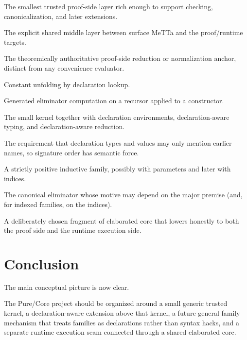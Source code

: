 \documentclass[11pt]{article}
\newcommand{\MeTTa}{\textup{MeTTa}}
\newcommand{\cdev}{\ensuremath{\mathsf{cdev}}}
\newcommand{\deltared}{\ensuremath{\delta}}
\newcommand{\iotared}{\ensuremath{\iota}}
\begin{document}
\begin{description}[leftmargin=2em,style=nextline]
  \item[Semantic waist] The smallest trusted proof-side layer rich enough to
  support checking, canonicalization, and later extensions.

  \item[Elaborated core] The explicit shared middle layer between surface
  \MeTTa{} and the proof/runtime targets.

  \item[Canonicalization / $\cdev$] The theoremically authoritative proof-side
  reduction or normalization anchor, distinct from any convenience evaluator.

  \item[$\deltared$-unfolding] Constant unfolding by declaration lookup.

  \item[$\iotared$-reduction] Generated eliminator computation on a recursor
  applied to a constructor.

  \item[Declaration-aware kernel] The small kernel together with declaration
  environments, declaration-aware typing, and declaration-aware reduction.

  \item[Prefix discipline] The requirement that declaration types and values may
  only mention earlier names, so signature order has semantic force.

  \item[Ordinary family] A strictly positive inductive family, possibly with
  parameters and later with indices.

  \item[Dependent recursor] The canonical eliminator whose motive may depend on
  the major premise (and, for indexed families, on the indices).

  \item[Dual-target fragment] A deliberately chosen fragment of elaborated core
  that lowers honestly to both the proof side and the runtime execution side.
\end{description}

\section{Conclusion}

The main conceptual picture is now clear.

The Pure/Core project should be organized around a small generic trusted kernel,
a declaration-aware extension above that kernel, a future general family
mechanism that treats families as declarations rather than syntax hacks, and a
separate runtime execution seam connected through a shared elaborated core.
\end{document}
